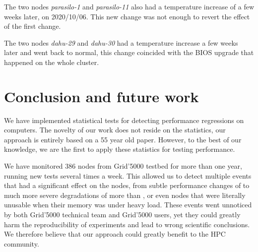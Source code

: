                 The two nodes \emph{parasilo-1} and \emph{parasilo-11} also had a temperature increase of
                 a few weeks later, on 2020/10/06. This new change was not enough to revert the effect
                of the first change.

                The two nodes \emph{dahu-29} and \emph{dahu-30} had a temperature increase a few weeks later and went
                back to normal, this change coincided with the BIOS upgrade that happened on the whole cluster.

    \section{Conclusion and future work}%
    \label{sec:test:conclusion}

        We have implemented statistical tests for detecting performance regressions on computers. The novelty of our
        work does not reside on the statistics, our approach is entirely based on a 55 year old paper. However, to the
        best of our knowledge, we are the first to apply these statistics for testing performance.

        We have monitored 386 nodes from Grid'5000 testbed for more than one year, running new tests several times a
        week. This allowed us to detect multiple events that had a significant effect on the nodes, from subtle
        performance changes of  to much more severe degradations of more than , or
        even nodes that were literally unusable when their memory was under heavy load. These events went unnoticed by
        both Grid'5000 technical team and Grid'5000 users, yet they could greatly harm the reproducibility of
        experiments and lead to wrong scientific conclusions. We therefore believe that our approach could greatly
        benefit to the HPC community.

